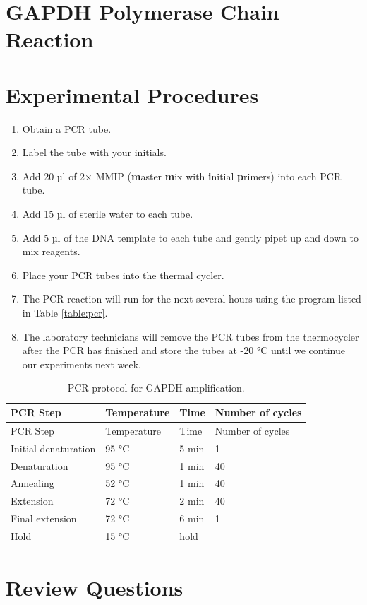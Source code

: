 \documentclass[]{book}
\providecommand{\tightlist}{%
  \setlength{\itemsep}{0pt}\setlength{\parskip}{0pt}}
\theoremstyle{definition}
\theoremstyle{definition}
\theoremstyle{definition}
\theoremstyle{remark}
\begin{document}
\section{GAPDH Polymerase Chain
Reaction}\label{gapdh-polymerase-chain-reaction}

\section{Experimental Procedures}\label{experimental-procedures-9}

\begin{enumerate}
\def\labelenumi{\arabic{enumi}.}
\tightlist
\item
  Obtain a PCR tube.
\item
  Label the tube with your initials.
\item
  Add 20 µl of 2× MMIP (\textbf{m}aster \textbf{m}ix with
  \textbf{i}nitial \textbf{p}rimers) into each PCR tube.
\item
  Add 15 µl of sterile water to each tube.
\item
  Add 5 µl of the DNA template to each tube and gently pipet up and down
  to mix reagents.
\item
  Place your PCR tubes into the thermal cycler.
\item
  The PCR reaction will run for the next several hours using the program
  listed in Table \ref{table:pcr}.
\item
  The laboratory technicians will remove the PCR tubes from the
  thermocycler after the PCR has finished and store the tubes at -20 °C
  until we continue our experiments next week.
\end{enumerate}

\begin{longtable}[]{@{}llll@{}}
\caption{\label{tab:pcr} PCR protocol for GAPDH
amplification.}\tabularnewline
\toprule
PCR Step & Temperature & Time & Number of cycles\tabularnewline
\midrule
\endfirsthead
\toprule
PCR Step & Temperature & Time & Number of cycles\tabularnewline
\midrule
\endhead
Initial denaturation & 95 °C & 5 min & 1\tabularnewline
Denaturation & 95 °C & 1 min & 40\tabularnewline
Annealing & 52 °C & 1 min & 40\tabularnewline
Extension & 72 °C & 2 min & 40\tabularnewline
Final extension & 72 °C & 6 min & 1\tabularnewline
Hold & 15 °C & hold &\tabularnewline
\bottomrule
\end{longtable}

\section{Review Questions}\label{review-questions-5}
\end{document}
